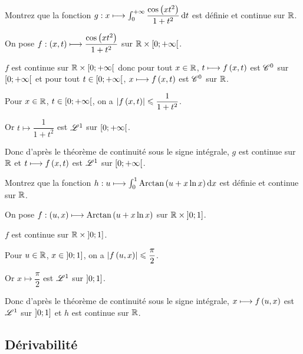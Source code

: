 \begin{exo}
Montrez que la fonction \(g:x\mapsto\int_0^{\pinf}\dfrac{\cos\paren{xt^2}}{1+t^2}\odif{t}\) est définie et continue sur \(\mathbb{R}\).
\end{exo}

\begin{corr}
On pose \(f:\left(x,t\right)\longmapsto\dfrac{\cos\left(xt^2\right)}{1+t^2}\) sur \(\mathbb{R}\times\left[0;+\infty\right[\).

\(f\) est continue sur \(\mathbb{R}\times\left[0;+\infty\right[\) donc pour tout \(x\in\mathbb{R}\), \(t\longmapsto f\left(x,t\right)\) est \(\mathscr{C}^{0}\) sur \(\left[0;+\infty\right[\) et pour tout \(t\in\left[0;+\infty\right[\), \(x\longmapsto f\left(x,t\right)\) est \(\mathscr{C}^{0}\) sur \(\mathbb{R}\).

Pour \(x\in\mathbb{R}\), \(t\in\left[0;+\infty\right[\), on a \(\left\lvert f\left(x,t\right)\right\rvert\leqslant\dfrac{1}{1+t^2}\).

Or \(t\mapsto\dfrac{1}{1+t^2}\) est \(\integ{1}{}{}\) sur \(\left[0;+\infty\right[\).

Donc d'après le théorème de continuité sous le signe intégrale, \(g\) est continue sur \(\mathbb{R}\) et \(t\longmapsto f\left(x,t\right)\) est \(\integ{1}{}{}\) sur \(\left[0;+\infty\right[\).
\end{corr}

\begin{exo}
Montrez que la fonction \(h:u\mapsto\int_0^1\Arctan\paren{u+x\ln x}\odif{x}\) est définie et continue sur \(\mathbb{R}\).
\end{exo}

\begin{corr}
On pose \(f:\left(u,x\right)\longmapsto\operatorname{Arctan}\left(u+x\ln x\right)\) sur \(\mathbb{R}\times\left]0;1\right]\).

\(f\) est continue sur \(\mathbb{R}\times\left]0;1\right]\).

Pour \(u\in\mathbb{R}\), \(x\in\left]0;1\right]\), on a \(\left\lvert f\left(u,x\right)\right\rvert\leqslant\dfrac{\pi}{2}\).

Or \(x\mapsto\dfrac{\pi}{2}\) est \(\integ{1}{}{}\) sur \(\left]0;1\right]\).

Donc d'après le théorème de continuité sous le signe intégrale, \(x\longmapsto f\left(u,x\right)\) est \(\integ{1}{}{}\) sur \(\left]0;1\right]\) et \(h\) est continue sur \(\mathbb{R}\).
\end{corr}

\subsection{Dérivabilité}

